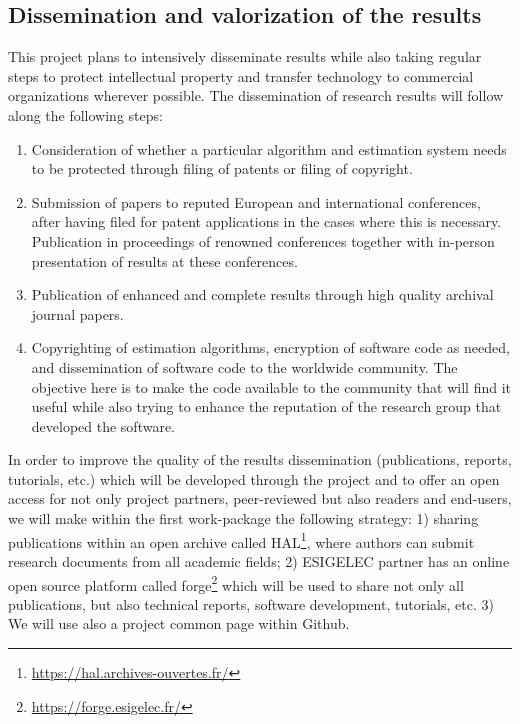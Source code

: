 \documentclass[a4paper,11pt]{article}
\begin{document}
\subsection[Dissemination and valorization of the results]{Dissemination and valorization of the results}
%
This project plans to intensively disseminate results while also taking regular steps to protect intellectual property and transfer technology to commercial organizations wherever possible. The dissemination of research results will follow along the following steps:
\begin{enumerate}
\vspace{-0.3cm}
\item Consideration of whether a particular algorithm and estimation system needs to be protected through filing of patents or filing of copyright.
\vspace{-0.3cm}
\item Submission of papers to reputed European and international conferences, after having filed for patent applications in the cases where this is necessary.  Publication in proceedings of renowned conferences together with in-person presentation of results at these conferences.
\vspace{-0.3cm}
\item Publication of enhanced and complete results through high quality archival journal papers.
\vspace{-0.3cm}
\item Copyrighting of estimation algorithms, encryption of software code as needed, and dissemination of software code to the worldwide community.  The objective here is to make the code available to the community that will find it useful while also trying to enhance the reputation of the research group that developed the software.
\end{enumerate}
\vspace{-0.3cm}
In order to improve the quality of the results dissemination (publications, reports, tutorials, etc.) which will be developed through the project and to offer an open access for not only project partners, peer-reviewed but also readers and end-users, we will make within the first work-package the following strategy: 1) sharing publications within an open archive called HAL\footnote{\url{https://hal.archives-ouvertes.fr/}}, where authors can submit research documents from all academic fields; 2) ESIGELEC partner has an online open source platform called forge\footnote{\url{https://forge.esigelec.fr/}} which will be used to share not only all publications, but also technical reports, software development, tutorials, etc. 3) We will use also a project common page within Github.
%
\end{document}
